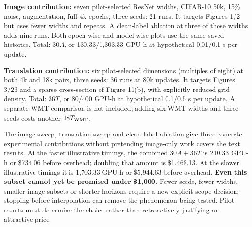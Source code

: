\documentclass{article}
\begin{document}
\textbf{Image contribution:} seven pilot-selected ResNet widths, CIFAR-10
50k, 15\% noise, augmentation, full 4k epochs, three seeds: 21 runs.
It targets Figures 1/2 but uses fewer widths and repeats. A clean-label
ablation at three of those widths adds nine runs. Both epoch-wise and
model-wise plots use the same saved histories. Total: $30A$, or
130.33/1,303.33 GPU-h at hypothetical 0.01/0.1 s per update.

\textbf{Translation contribution:} six pilot-selected dimensions (multiples
of eight) at both 4k and 18k pairs, three seeds: 36 runs at 80k updates.
It targets Figures 3/23 and a sparse cross-section of Figure 11(b), with
explicitly reduced grid density. Total: $36T$, or 80/400 GPU-h at
hypothetical 0.1/0.5 s per update. A separate WMT comparison is not included;
adding six WMT widths and three seeds costs another $18T_{\rm WMT}$.

The image sweep, translation sweep and clean-label ablation give three
concrete experimental contributions without pretending image-only work
covers the text results. At the faster illustrative timings, the combined
$30A+36T$ is 210.33 GPU-h or \$734.06 before overhead; doubling that amount
is \$1,468.13. At the slower illustrative timings it is 1,703.33 GPU-h or
\$5,944.63 before overhead. \textbf{Even this subset cannot yet be promised
under \$1,000.} Fewer seeds, fewer widths, smaller image subsets or shorter
horizons require a new explicit scope decision; stopping before interpolation
can remove the phenomenon being tested. Pilot results must determine the
choice rather than retroactively justifying an attractive price.
\end{document}
